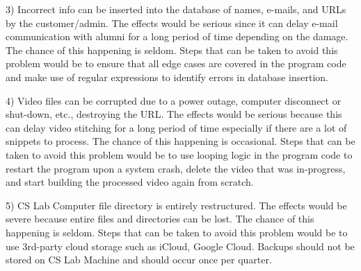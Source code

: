 3) Incorrect info can be inserted into the database of names, e-mails, and URLs by the customer/admin. 
The effects would be serious since it can delay e-mail communication with alumni for a long period of time depending on the damage. 
The chance of this happening is seldom. Steps that can be taken to avoid this problem would be to ensure that all edge cases are covered 
in the program code and make use of regular expressions to identify errors in database insertion.

4) Video files can be corrupted due to a power outage, computer disconnect or shut-down, etc., destroying the URL.
The effects would be serious because this can delay video stitching for a long period of time especially 
if there are a lot of snippets to process. The chance of this happening is occasional. Steps that can be taken to 
avoid this problem would be to use looping logic in the program code to restart the program upon a system crash, delete the video that 
was in-progress, and start building the processed video again from scratch.

5) CS Lab Computer file directory is entirely restructured. 
The effects would be severe because entire files and directories can be lost. The chance
of this happening is seldom. Steps that can be taken to avoid this problem would be to 
use 3rd-party cloud storage such as iCloud, Google Cloud. Backups should not be stored on CS Lab Machine 
and should occur once per quarter.

